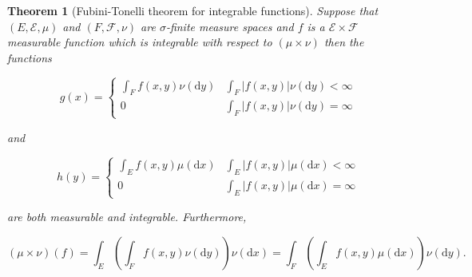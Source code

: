 \documentclass[
]{book}
\newtheorem{theorem}{Theorem}[chapter]
\theoremstyle{definition}
\theoremstyle{definition}
\theoremstyle{definition}
\theoremstyle{definition}
\theoremstyle{remark}
\begin{document}
\begin{theorem}[Fubini-Tonelli theorem for integrable functions]
Suppose that \((E, \mathcal{E}, \mu)\) and \((F, \mathcal{F}, \nu)\) are \(\sigma\)-finite measure spaces and \(f\) is a \(\mathcal{E} \times \mathcal{F}\) measurable function which is integrable with respect to \((\mu \times \nu)\) then the functions

\[ g(x) = \left\{ \begin{array}{ll} \int_F f(x,y) \nu(\mathrm{d}y) & \int_F|f(x,y)| \nu(\mathrm{d}y) < \infty \\
0 & \int_F |f(x,y)| \nu(\mathrm{d}y) = \infty  \end{array} \right. \]

and

\[ h(y) = \left\{ \begin{array}{ll} \int_E f(x,y) \mu(\mathrm{d}x) & \int_E |f(x,y)| \mu(\mathrm{d}x) < \infty \\
0 & \int_E |f(x,y)| \mu(\mathrm{d}x) = \infty \end{array} \right. \]

are both measurable and integrable. Furthermore,

\[ (\mu \times \nu)(f) = \int_E \left( \int_F f(x,y) \nu(\mathrm{d}y) \right) \nu(\mathrm{d}x) = \int_F \left( \int_E f(x,y) \mu(\mathrm{d}x) \right) \nu(\mathrm{d}y). \]
\end{theorem}
\end{document}
